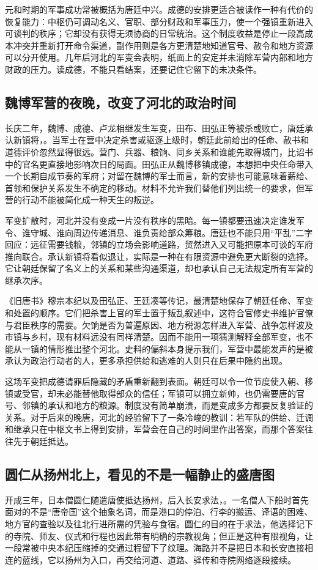 元和时期的军事成功常被概括为唐廷中兴。成德的安排更适合被读作一种有代价的恢复能力：中枢仍可调动名义、官职、部分财政和军事压力，使一个强镇重新进入可谈判的秩序；它却没有获得无须协商的日常统治。这个制度收益是停止一段高成本冲突并重新打开命令渠道，副作用则是各方更清楚地知道官号、赦令和地方资源可以分开使用。几年后河北的军变会表明，纸面上的安定并未消除军营内部和地方财政的压力。读成德，不能只看结案，还要记住它留下的未决条件。

\subsection{魏博军营的夜晚，改变了河北的政治时间}
长庆二年，魏博、成德、卢龙相继发生军变，田布、田弘正等被杀或败亡，唐廷承认新镇将，。当军士在营中决定杀害或驱逐上级时，朝廷此前给出的任命、赦书和道德评价忽然显得很远。营门、兵器、粮饷、同乡关系和谁能先取得城门，比诏书中的官名更直接地影响次日的局面。田弘正从魏博移镇成德，本想把中央任命带入一个长期自成节奏的军府；对留在魏博的军士而言，新的安排也可能意味着薪给、首领和保护关系发生不确定的移动。材料不允许我们替他们列出统一的要求，但军营的行动不能被简化成一种天生的叛逆。

军变扩散时，河北并没有变成一片没有秩序的黑暗。每一镇都要迅速决定谁发军令、谁守城、谁向周边传递消息、谁负责给部众筹粮。唐廷也不能只用“平乱”二字回应：远征需要钱粮，邻镇的立场会影响道路，贸然进入又可能把原本可谈的军府推向联合。承认新镇将看似退让，实际是一种在有限资源中避免更大断裂的选择。它让朝廷保留了名义上的关系和某些沟通渠道，却也承认自己无法规定所有军营的继承次序。

《旧唐书》穆宗本纪以及田弘正、王廷凑等传记，最清楚地保存了朝廷任命、军变和处置的顺序。它们把杀害上官的军士置于叛乱叙述中，这符合官修史书维护官僚与君臣秩序的需要。欠饷是否为普遍原因、地方税源怎样进入军营、战争怎样波及市镇与乡村，现有材料远没有同样清楚。因而不能用一项猜测解释全部军变，也不能从一镇的情形推出整个河北。史料的偏斜本身提示我们，军营中最能发声的是被承认为政治行动者的人，更多承担供给和逃难的人则只在后果中隐约出现。

这场军变把成德请罪后隐藏的矛盾重新翻到表面。朝廷可以令一位节度使入朝、移镇或受官，却未必能替他取得部众的信任；军镇可以拥立新帅，也仍需要唐的官号、邻镇的承认和地方的粮源。制度没有简单崩溃，而是变成多方都要反复验证的关系。对于后来的晚唐，河北的经验留下了一条冷峻的教训：若军队的供给、迁调和继承只在中枢文书上得到安排，军营会在自己的时间里作出答案，而那个答案往往先于朝廷抵达。

\subsection{圆仁从扬州北上，看见的不是一幅静止的盛唐图}
开成三年，日本僧圆仁随遣唐使抵达扬州，后入长安求法，。一名僧人下船时首先面对的不是“唐帝国”这个抽象名词，而是港口的停泊、行李的搬运、译语的困难、地方官的查验以及往北行进所需的凭验与食宿。圆仁的目的在于求法，他选择记下的寺院、师友、仪式和行程也因此带有明确的宗教视角；但正是这种有限视角，让一段常被中央本纪压缩掉的交通过程留下了纹理。海路并不是把日本和长安直接相连的蓝线，它以扬州为入口，再交给河道、道路、驿传和寺院网络逐段接续。

